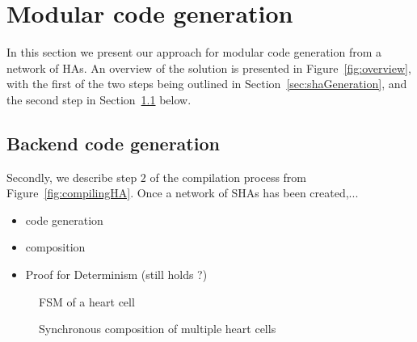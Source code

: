 \section{Modular code generation}
\label{sec:codeGen}

In this section we present our approach for modular code generation from a network of \acp{HA}. 
An overview of the solution is presented in Figure~\ref{fig:overview}, with the first of the two steps being outlined in Section~\ref{sec:shaGeneration}, and the second step in Section~\ref{sec:backendCodeGeneration} below.



\subsection{Backend code generation}
\label{sec:backendCodeGeneration}

Secondly, we describe step $2$ of the compilation process from Figure~\ref{fig:compilingHA}. Once a network of \acp{SHA} has been created,...

\begin{itemize}
	\item code generation
	\item composition
	\item Proof for Determinism (still holds ?)
\end{itemize}

\begin{figure}
	\centering
	
	\caption{\acf{FSM} of a heart cell \label{fig:heartCellFSM}}
\end{figure}


\begin{figure}
	\centering
	
	\caption{Synchronous composition of multiple heart cells \label{fig:heartCellComposition}}
\end{figure}